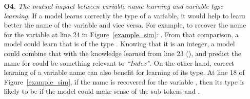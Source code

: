 %
%



\textbf{O4.} {\em The mutual impact between variable name learning and
  variable type learning.} If a model learns correctly the type of a
variable, it would help to learn better the name of the variable and
vice versa. For example, to recover the name 
for the variable  at line 24 in Figure~\ref{example_sim}:
. From that comparison, a model could learn that
 is of the type . Knowing that it is an integer, a
model could combine that with the knowledge learned from line 23
(), and
predict the name for  could be something relevant to {\em
  ``Index''}. On the other hand, correct learning of a variable name
can also benefit for learning of its type. At line 18 of
Figure~\ref{example_sim}, if the name  is
recovered for the variable , then its type is likely to be
 if the model could make sense of the sub-tokens
 and .


